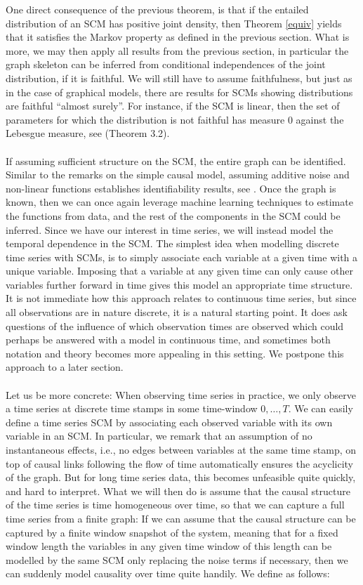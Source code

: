 \documentclass[11pt, a4paper]{memoir}
\theoremstyle{break}
\theoremstyle{break}
\theoremstyle{nonumberplain}
\begin{document}
One direct consequence of the previous theorem, is that if the entailed distribution of an SCM has positive joint density, then Theorem \ref{equiv} yields that it satisfies the Markov property as defined in the previous section. What is more, we may then apply all results from the previous section, in particular the graph skeleton can be inferred from conditional independences of the joint distribution, if it is faithful. We will still have to assume faithfulness, but just as in the case of graphical models, there are results for SCMs showing distributions are faithful \enquote{almost surely}. For instance, if the SCM is linear, then the set of parameters for which the distribution is not faithful has measure 0 against the Lebesgue measure, see \cite{Spirtes} (Theorem 3.2).\\\\
If assuming sufficient structure on the SCM, the entire graph can be identified. Similar to the remarks on the simple causal model, assuming additive noise and non-linear functions establishes identifiability results, see \cite{ANM3}. Once the graph is known, then we can once again leverage machine learning techniques to estimate the functions from data, and the rest of the components in the SCM could be inferred. Since we have our interest in time series, we will instead model the temporal dependence in the SCM. The simplest idea when modelling discrete time series with SCMs, is to simply associate each variable at a given time with a unique variable. Imposing that a variable at any given time can only cause other variables further forward in time gives this model an appropriate time structure. It is not immediate how this approach relates to continuous time series, but since all observations are in nature discrete, it is a natural starting point.  It does ask questions of the influence of which observation times are observed which could perhaps be answered with a model in continuous time, and sometimes both notation and theory becomes more appealing in this setting. We postpone this approach to a later section.\\\\
Let us be more concrete: When observing time series in practice, we only observe a time series at discrete time stamps in some time-window $0,\ldots, T$. We can easily define a time series SCM by associating each observed variable with its own variable in an SCM. In particular, we remark that an assumption of no instantaneous effects, i.e., no edges between variables at the same time stamp, on top of causal links following the flow of time automatically ensures the acyclicity of the graph. But for long time series data, this becomes unfeasible quite quickly, and hard to interpret. What we will then do is assume that the causal structure of the time series is time homogeneous over time, so that we can capture a full time series from a finite graph: If we can assume that the causal structure can be captured by a finite window snapshot of the system, meaning that for a fixed window length the variables in any given time window of this length can be modelled by the same SCM only replacing the noise terms if necessary, then we can suddenly model causality over time quite handily. We define as follows:
\end{document}
